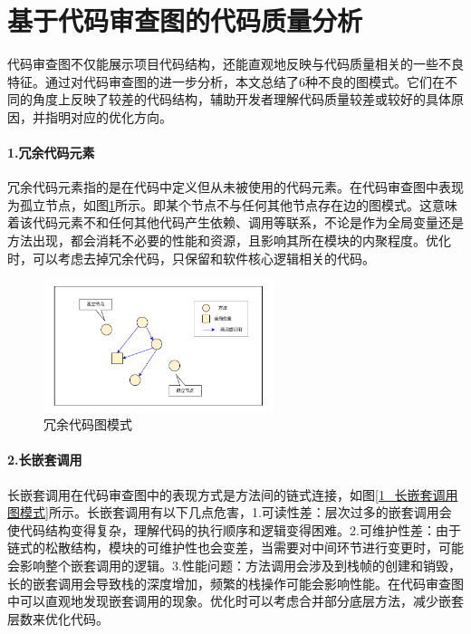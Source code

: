 \section{基于代码审查图的代码质量分析}
\label{4_不良图模式}

代码审查图不仅能展示项目代码结构，还能直观地反映与代码质量相关的一些不良特征。通过对代码审查图的进一步分析，本文总结了6种不良的图模式。它们在不同的角度上反映了较差的代码结构，辅助开发者理解代码质量较差或较好的具体原因，并指明对应的优化方向。

\paragraph{1.冗余代码元素} 冗余代码元素指的是在代码中定义但从未被使用的代码元素。在代码审查图中表现为孤立节点，如图\ref{1_冗余代码图模式}所示。即某个节点不与任何其他节点存在边的图模式。这意味着该代码元素不和任何其他代码产生依赖、调用等联系，不论是作为全局变量还是方法出现，都会消耗不必要的性能和资源，且影响其所在模块的内聚程度。优化时，可以考虑去掉冗余代码，只保留和软件核心逻辑相关的代码。

\begin{figure}[h]
\centering
\includegraphics[width = 0.6\textwidth]{figures/孤立节点图模式_2.pdf}
\caption{冗余代码图模式}
\label{1_冗余代码图模式}
\end{figure}



\paragraph{2.长嵌套调用} 长嵌套调用在代码审查图中的表现方式是方法间的链式连接，如图\ref{1_长嵌套调用图模式}所示。长嵌套调用有以下几点危害，1.可读性差：层次过多的嵌套调用会使代码结构变得复杂，理解代码的执行顺序和逻辑变得困难。2.可维护性差：由于链式的松散结构，模块的可维护性也会变差，当需要对中间环节进行变更时，可能会影响整个嵌套调用的逻辑。3.性能问题：方法调用会涉及到栈帧的创建和销毁，长的嵌套调用会导致栈的深度增加，频繁的栈操作可能会影响性能。在代码审查图中可以直观地发现嵌套调用的现象。优化时可以考虑合并部分底层方法，减少嵌套层数来优化代码。

